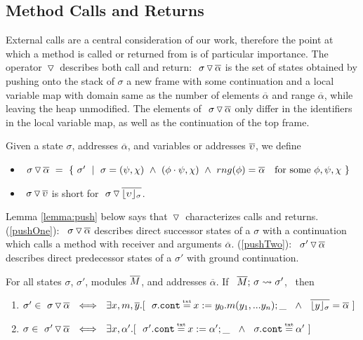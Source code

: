 \subsection{Method Calls and Returns}


{External calls are a central consideration of our work, therefore  the point at which a method is called or returned from is of particular importance. 
The operator $\, {\triangledown}\,$ describes both call and return:
 $  \ {\sigma} \, {\triangledown}\, \overline{\alpha}  $ is  the set of states obtained by pushing onto the stack of $\sigma$ a new frame with some continuation  and a local variable map with domain same as the number of elements $\overline \alpha$ and range  $\overline \alpha$, while leaving the heap unmodified.
The elements of $  \ {\sigma} \, {\triangledown}\, \overline{\alpha}  $ only differ in the identifiers in the local variable map, as well as the continuation  of the top frame. 
}

\begin{definition}
\label{def:push:frame}
Given a state $\sigma$, addresses $\overline \alpha$, and variables or addresses $\overline {\upsilon}$, we define
\begin{itemize}
\item
$ \PushS  {\alpha} {\sigma} \ =\ \{ \ \sigma' \ \mid\ \sigma=(\psi, \chi)\  \wedge\  (\phi\cdot \psi, \chi) \ \wedge\ rng(\phi)=\overline \alpha \ \ \mbox{ for some } \phi, \psi, \chi \ \}$
\item
{$  \ {\sigma} \, {\triangledown}\, \overline{\upsilon} $ is short for  $  \ {\sigma} \, {\triangledown}\, \overline{\lfloor \upsilon \rfloor_{\sigma}}  $.}
\end{itemize}
\end{definition}

 {Lemma \ref{lemma:push} below says that  $\, {\triangledown}\,$ characterizes  calls and returns.  (\ref{pushOne}):\ $  \ {\sigma} \, {\triangledown}\, \overline{\alpha} $ describes    direct successor states of  a $\sigma$ with a continuation which calls a method with receiver and arguments $\overline \alpha$. 
 (\ref{pushTwo}):\ $  \ {\sigma'} \, {\triangledown}\, \overline{\alpha} $  describes direct predecessor states of  a $\sigma'$ with ground continuation.}
  
\begin{lemma}%
\label{lemma:push}
For all states $\sigma$, $\sigma'$, modules $\overline{M}$, and addresses $\overline \alpha$. If \ $\overline{M};\, \sigma \leadsto {\sigma'} $, \ then 
\begin{enumerate}
\item
\label{pushOne}
$\sigma'\in   \PushS  {\alpha} {\sigma}  \ \ \Longleftrightarrow \ \ 
\exists x, m, \overline{y}.[\ \ \sigma.\prg{cont} \txteq x:=y_0.m(y_1,...y_n); \_\ \ \wedge \ \
{\overline { \interpret  \sigma y}} = \overline \alpha \ ] $
\item
\label{pushTwo}
$\sigma\in   \PushS  {\alpha} {\sigma'}  \ \ \Longleftrightarrow \ \ \exists x, \alpha'.[\ \  \sigma'.\prg{cont}\txteq x:=\alpha';\_ \ \ \wedge \ \  \sigma.\prg{cont}\txteq\alpha'\  ] $
\end{enumerate}

\end{lemma}


